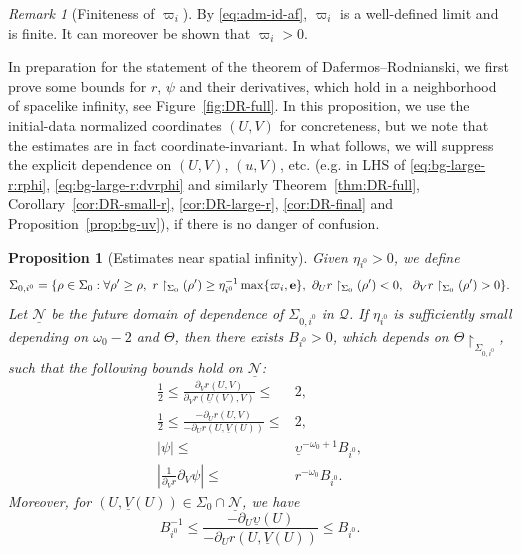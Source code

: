 \documentclass[10pt, reqno]{amsart}
\newtheorem{proposition}[theorem]{Proposition}
\theoremstyle{definition}
\theoremstyle{remark}
\newtheorem{remark}[theorem]{Remark}
\theoremstyle{conjecture}
\numberwithin{equation}{section}
\newcommand{\set}[1]{\{#1\}}
\newcommand{\rd}{\partial}
\newcommand{\0}{\emptyset}
\newcommand{\Sgm}{\Sigma}
\newcommand{\Tht}{\Theta}
\newcommand{\omg}{\omega}
\newcommand{\ups}{\upsilon}
\newcommand{\bfe}{{\bf e}}
\newcommand{\calN}{\mathcal N}
\newcommand{\calQ}{\mathcal Q}
\newcommand{\PD}{\calQ}
\newcommand{\e}{\bfe}							%
\newcommand{\Abs}[1]{\left\vert #1 \right\vert}
\begin{document}
\begin{remark}[Finiteness of $\varpi_i$]
By \eqref{eq:adm-id-af}, $\varpi_i$ is a well-defined limit and is finite. It can moreover be shown that $\varpi_i>0$.
\end{remark}

In preparation for the statement of the theorem of Dafermos--Rodnianski, we first prove some bounds for $r$, $\psi$ and their derivatives, which hold in a neighborhood of spacelike infinity, see Figure~\ref{fig:DR-full}. In this proposition, we use the initial-data normalized coordinates $(U,V)$ for concreteness, but we note that the estimates are in fact coordinate-invariant. In what follows, we will suppress the explicit dependence on $(U, V)$, $(u,V)$, etc. (e.g. in LHS of \eqref{eq:bg-large-r:rphi}, \eqref{eq:bg-large-r:dvrphi} and similarly Theorem~\ref{thm:DR-full}, Corollary~\ref{cor:DR-small-r}, \ref{cor:DR-large-r}, \ref{cor:DR-final} and Proposition~\ref{prop:bg-uv}), if there is no danger of confusion.
\begin{proposition}[Estimates near spatial infinity] \label{prop:bg-large-r}
Given $\eta_{i^{0}} > 0$, we define
\begin{equation*}
	\Sgm_{0, i^{0}} = \set{\rho \in \Sgm_{0} : \forall \rho' \geq \rho, \ r \restriction_{\Sgm_{0}}(\rho') \geq \eta_{i^{0}}^{-1} \max \set{\varpi_{i}, \e}, \ \rd_{U} r \restriction_{\Sgm_{0}}(\rho') < 0, \ \ \rd_{V} r \restriction_{\Sgm_{0}}(\rho') > 0}.
\end{equation*}
Let $\underline{\calN}$ be the future domain of dependence of $\Sgm_{0, i^{0}}$ in $\PD$. If $\eta_{i^{0}}$ is sufficiently small depending on $\omg_{0}-2$ and $\Tht$, then there exists $B_{i^{0}} > 0$, which depends on $\Tht \restriction_{\Sgm_{0, i^{0}}}$, such that the following bounds hold on $\underline{\calN}$:
\begin{align} 
	\frac{1}{2} \leq \frac{\rd_{V} r(U, V)}{\rd_{V} r(\underline{U}(V), V)} \leq & 2, \label{eq:bg-large-r:dvr}  \\
	\frac{1}{2} \leq \frac{-\rd_{U} r(U, V)}{-\rd_{U} r(U, \underline{V}(U))} \leq & 2, \label{eq:bg-large-r:dur}  \\
\Abs{\psi}
	\leq & \underline{\ups}^{-\omg_{0}+1} B_{i^{0}} ,			\label{eq:bg-large-r:rphi} \\
\Abs{\frac{1}{\rd_{V} r} \rd_{V} \psi }
	\leq & r^{-\omg_{0}} B_{i^{0}} .			\label{eq:bg-large-r:dvrphi}
\end{align}
Moreover, for $(U, \underline{V}(U)) \in \Sgm_{0} \cap \underline{\calN}$, we have
\begin{equation} \label{eq:bg-large-r:duups} 
	B_{i^{0}}^{-1} \leq \frac{-\rd_{U} \underline{\ups}(U)}{-\rd_{U} r(U, \underline{V}(U))} \leq B_{i^{0}}.
\end{equation}
\end{proposition}
\end{document}
